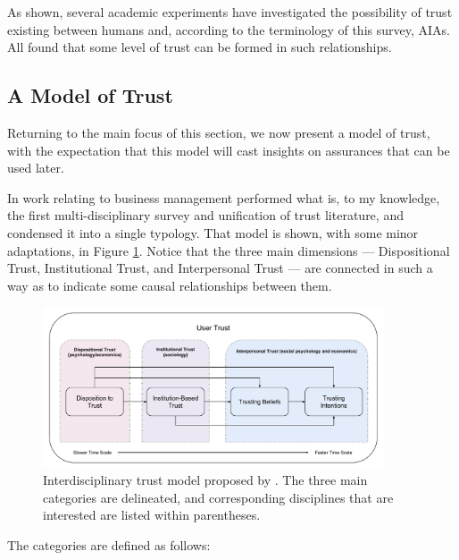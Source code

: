         As shown, several academic experiments have investigated the possibility of trust existing between humans and, according to the terminology of this survey, AIAs. All found that some level of trust can be formed in such relationships.

    \subsection{A Model of Trust}
        Returning to the main focus of this section, we now present a model of trust, with the expectation that this model will cast insights on assurances that can be used later.

        In work relating to business management \cite{McKnight1998-ty} performed what is, to my knowledge, the first multi-disciplinary survey and unification of trust literature, and condensed it into a single typology. That model is shown, with some minor adaptations, in Figure \ref{fig:UserTrust}. Notice that the three main dimensions --- Dispositional Trust, Institutional Trust, and Interpersonal Trust --- are connected in such a way as to indicate some causal relationships between them.

        \begin{figure}[htbp]
            \centering
            \includegraphics[width=0.9\textwidth]{Figures/UserTrust}
            \caption{Interdisciplinary trust model proposed by \citet{McKnight2001-fa}. The three main categories are delineated, and corresponding disciplines that are interested are listed within parentheses.}
            \label{fig:UserTrust}
        \end{figure}

        The categories are defined as follows:

